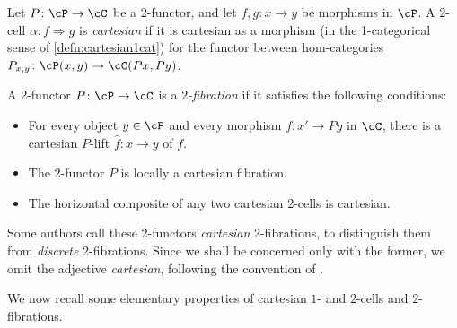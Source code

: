 \documentclass[11pt, dvipsnames]{amsart}
\begin{document}
		\begin{defn}
		Let $P\colon \cP\to\cC$ be a 2-functor, and let $f,g\colon x\to y$ be morphisms in $\cP$. A $2$-cell $\alpha\colon f \Rightarrow g$  is \emph{cartesian} if it is cartesian as a morphism (in the 1-categorical sense of \cref{defn:cartesian1cat}) for the functor between hom-categories $P_{x,y}\colon \cP(x,y)\to \cC(Px,Py)$. 
		\end{defn}

		\begin{defn}\label{Def:2-fibration}
			A 2-functor $P\colon\cP\to\cC$ is a \emph{$2$-fibration} if it satisfies the following conditions:
			\begin{itemize}
				\item \label{Def:2-fibration.1}
				For every object $y\in\cP$ and every morphism $f\colon x'\to Py$ in $\cC$, there is a cartesian $P$-lift $\widehat{f}\colon x\to y$ of $f$.
				\item \label{Def:2-fibration.2} The 2-functor
				$P$ is locally a cartesian fibration.
				\item \label{Def:2-fibration.3}
				The horizontal composite of any two cartesian 2-cells is cartesian.
			\end{itemize}
		\end{defn}

        \begin{rmk}
            Some authors call these 2-functors \textit{cartesian} 2-fibrations, to distinguish them from \textit{discrete} 2-fibrations. Since we shall be concerned only with the former, we omit the adjective \textit{cartesian}, following the convention of \cite{Buckley2014}.
        \end{rmk}
        
		We now recall some elementary properties of cartesian $1$- and $2$-cells and $2$-fibrations.
\end{document}
